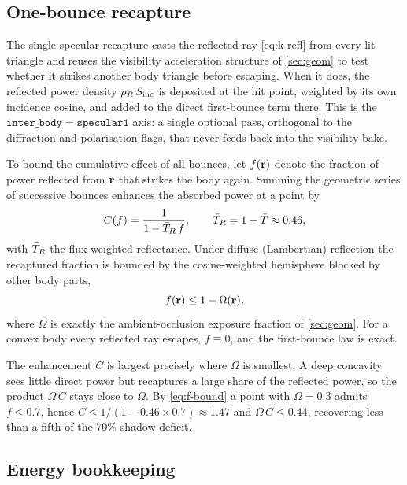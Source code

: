 \subsection{One-bounce recapture}

The single specular recapture casts the reflected ray
\cref{eq:k-refl} from every lit triangle and reuses the visibility
acceleration structure of \cref{sec:geom} to test whether it
strikes another body triangle before escaping. When it does, the
reflected power density $\rho_R\,S_{\mathrm{inc}}$ is deposited at the hit point,
weighted by its own incidence cosine, and added to the direct
first-bounce term there. This is the $\mathtt{inter\_body=specular1}$
axis: a single optional pass, orthogonal to the diffraction and
polarisation flags, that never feeds back into the visibility bake.

To bound the cumulative effect of all bounces, let $f(\mathbf{r})$ denote the
fraction of power reflected from $\mathbf{r}$ that strikes the body again.
Summing the geometric series of successive bounces enhances the
absorbed power at a point by
\begin{equation}\label{eq:radiosity-C}
  C(f)=\frac{1}{1-\bar{T}_R\,f},\qquad \bar{T}_R=1-\bar{T}\approx 0.46,
\end{equation}
with $\bar{T}_R$ the flux-weighted reflectance. Under diffuse
(Lambertian) reflection the recaptured fraction is bounded by the
cosine-weighted hemisphere blocked by other body parts,
\begin{equation}\label{eq:f-bound}
  f(\mathbf{r})\le 1-\Omega(\mathbf{r}),
\end{equation}
where $\Omega$ is exactly the ambient-occlusion exposure fraction of
\cref{sec:geom}. For a convex body every reflected ray escapes,
$f\equiv 0$, and the first-bounce law is exact.

\begin{proposition}\label{prop:self-comp}
The enhancement $C$ is largest precisely where $\Omega$ is smallest. A
deep concavity sees little direct power but recaptures a large share of
the reflected power, so the product $\Omega\,C$ stays close to $\Omega$.
By \cref{eq:f-bound} a point with $\Omega=0.3$ admits $f\le 0.7$, hence
$C\le 1/(1-0.46\times 0.7)\approx 1.47$ and $\Omega\,C\le 0.44$,
recovering less than a fifth of the $70\%$ shadow deficit.
\end{proposition}

\subsection{Energy bookkeeping}

